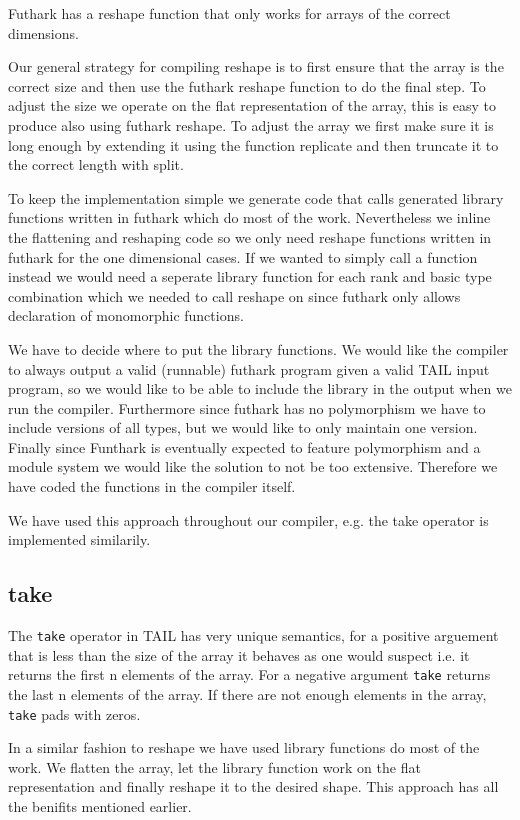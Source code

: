 \documentclass[11pt]{article}
\begin{document}
Futhark has a reshape function that only works for arrays of the correct dimensions.

Our general strategy for compiling reshape is to first ensure that the array is the correct size and then use the futhark reshape
function to do the final step. To adjust the size we operate on the flat representation of the array, this is easy to produce also
using futhark reshape. To adjust the array we first make sure it is long enough by extending it using the function replicate and then
truncate it to the correct length with split.

To keep the implementation simple we generate code that calls generated library functions written in futhark which do most of the work.
Nevertheless we inline the flattening and reshaping code so we only need reshape functions written in futhark
for the one dimensional cases. If we wanted to simply call a function instead we would need a seperate library function for each
rank and basic type combination which we needed to call reshape on since futhark only allows declaration of monomorphic functions.

We have to decide where to put the library functions.
We would like the compiler to always output a valid (runnable) futhark program given a valid TAIL input program, so we would like to
be able to include the library in the output when we run the compiler.
Furthermore since futhark has no polymorphism we have to include versions of all types, but we would like to only maintain one version.
Finally since Funthark is eventually expected to feature polymorphism and a module system we would like the solution to not be too
extensive. Therefore we have coded the functions in the compiler itself.

We have used this approach throughout our compiler, e.g. the take operator is implemented similarily.

\subsection{take} 

The {\tt take} operator in TAIL has very unique semantics, for a positive arguement that is less than the size of the array it behaves as one would suspect i.e. it returns the first n elements of the array. For a negative argument {\tt take} returns the last n elements of the array. If there are not enough elements in the array, {\tt take} pads with zeros.

In a similar fashion to reshape we have used library functions do most of the work.
We flatten the array, let the library function work on the flat representation and finally reshape it to the desired shape.
This approach has all the benifits mentioned earlier.
\end{document}
